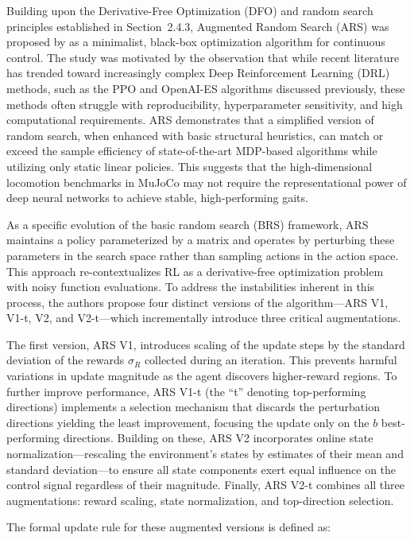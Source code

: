 Building upon the Derivative-Free Optimization (DFO) \citep{kolda2003directsearch} and random search principles established in Section~2.4.3, Augmented Random Search (ARS) was proposed by \citep{mania2018randomsearch} as a minimalist, black-box optimization algorithm for continuous control. The study was motivated by the observation that while recent literature has trended toward increasingly complex Deep Reinforcement Learning (DRL) methods, such as the PPO and OpenAI-ES algorithms discussed previously, these methods often struggle with reproducibility, hyperparameter sensitivity, and high computational requirements. ARS demonstrates that a simplified version of random search, when enhanced with basic structural heuristics, can match or exceed the sample efficiency of state-of-the-art MDP-based algorithms while utilizing only static linear policies. This suggests that the high-dimensional locomotion benchmarks in MuJoCo may not require the representational power of deep neural networks to achieve stable, high-performing gaits.

As a specific evolution of the basic random search (BRS) framework, ARS maintains a policy parameterized by a matrix and operates by perturbing these parameters in the search space rather than sampling actions in the action space. This approach re-contextualizes RL as a derivative-free optimization problem with noisy function evaluations. To address the instabilities inherent in this process, the authors propose four distinct versions of the algorithm—ARS V1, V1-t, V2, and V2-t—which incrementally introduce three critical augmentations.

The first version, ARS V1, introduces scaling of the update steps by the standard deviation of the rewards $\sigma_R$ collected during an iteration. This prevents harmful variations in update magnitude as the agent discovers higher-reward regions. To further improve performance, ARS V1-t (the ``t'' denoting top-performing directions) implements a selection mechanism that discards the perturbation directions yielding the least improvement, focusing the update only on the $b$ best-performing directions. Building on these, ARS V2 incorporates online state normalization—rescaling the environment's states by estimates of their mean and standard deviation—to ensure all state components exert equal influence on the control signal regardless of their magnitude. Finally, ARS V2-t combines all three augmentations: reward scaling, state normalization, and top-direction selection.

The formal update rule for these augmented versions is defined as:

